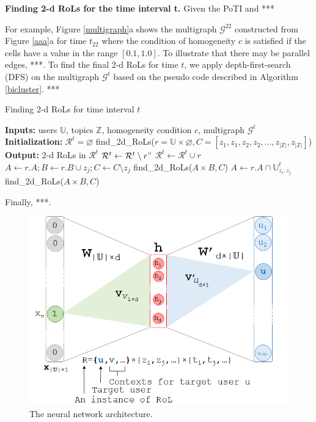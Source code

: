 \documentclass[sigconf]{acmart}
\begin{document}
\textbf{Finding 2-d RoLs for the time interval t.} Given the PoTI and ***

For example, Figure \ref{multigraph}a shows the multigraph $\mathcal{G}^{22}$ constructed from Figure \ref{aaa}a for time $t_{22}$ where the condition of homogeneity $c$ is satisfied if the cells have a value in the range $[0.1, 1.0]$. To illustrate that there may be parallel edges, ***. To find the final 2-d RoLs for time $t$, we apply depth-first-search (DFS) on the multigraph $\mathcal{G}^t$ based on the pseudo code described in Algorithm \ref{bicluster}. ***
\begin{algorithm}[t]
\caption{Finding 2-d RoLs for time interval $t$}
\label{bicluster}
\begin{algorithmic}[1]
\Statex\textbf{Inputs:} 
\Statex\hspace{\algorithmicindent} users $\mathbb{U}$, topics $\mathbb{Z}$, homogeneity condition $c$, multigraph $\mathcal{G}^t$ \Statex\textbf{Initialization:}
\Statex\hspace{\algorithmicindent} $\mathcal{R}^t=\varnothing$
\Statex\hspace{\algorithmicindent} find\_2d\_RoLs($r=\mathbb{U}\times\varnothing,C=[z_1,z_1,z_2,z_2,...,z_{|\mathbb{Z}|},z_{|\mathbb{Z}|}]$)
\Statex\textbf{Output:} 2-d RoLs in $\mathcal{R}^t$
\State $\mathcal{R}^t\leftarrow\mathcal{R}^t\setminus{r"}$
\EndIf
\EndFor
\State $\mathcal{R}^t\leftarrow\mathcal{R}^t\cup{r}$\label{c}
\EndIf
{}
\State $A\leftarrow{r.A};B\leftarrow{r.B\cup{z_j}};C\leftarrow{C\setminus{z_j}}$
\State find\_2d\_RoLs($A\times{B},C$)\label{a}
\Else
{}
\State $A\leftarrow{r.A}\cap{\mathbb{U}^t_{z_i,z_j}}$\label{b}
\State find\_2d\_RoLs($A\times{B},C$)\label{z}
\EndFor
\EndFor
\EndIf
\EndFor
\EndProcedure
\end{algorithmic}
\end{algorithm}
Finally, ***.

\begin{figure}[t]
\centering
\includegraphics[width=0.8\columnwidth]{Images/neural_net.png}
\caption{The neural network architecture.\label{neural_net}}
\end{figure}
\end{document}
